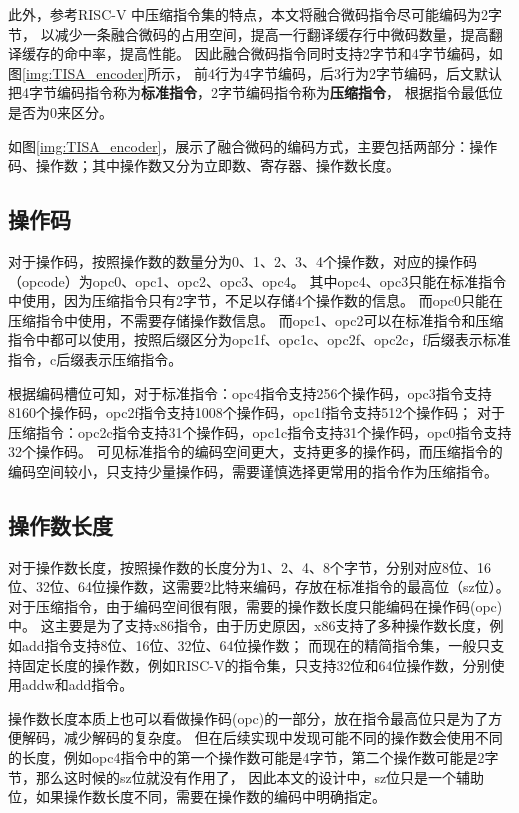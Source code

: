 此外，参考RISC-V 中压缩指令集的特点，本文将融合微码指令尽可能编码为2字节，
以减少一条融合微码的占用空间，提高一行翻译缓存行中微码数量，提高翻译缓存的命中率，提高性能。
因此融合微码指令同时支持2字节和4字节编码，如图\ref{img:TISA_encoder}所示，
前4行为4字节编码，后3行为2字节编码，后文默认把4字节编码指令称为\textbf{标准指令}，2字节编码指令称为\textbf{压缩指令}，
根据指令最低位是否为0来区分。

如图\ref{img:TISA_encoder}，展示了融合微码的编码方式，主要包括两部分：操作码、操作数；其中操作数又分为立即数、寄存器、操作数长度。



\subsection{操作码}
对于操作码，按照操作数的数量分为0、1、2、3、4个操作数，对应的操作码（opcode）为opc0、opc1、opc2、opc3、opc4。
其中opc4、opc3只能在标准指令中使用，因为压缩指令只有2字节，不足以存储4个操作数的信息。
而opc0只能在压缩指令中使用，不需要存储操作数信息。
而opc1、opc2可以在标准指令和压缩指令中都可以使用，按照后缀区分为opc1f、opc1c、opc2f、opc2c，f后缀表示标准指令，c后缀表示压缩指令。

根据编码槽位可知，对于标准指令：opc4指令支持256个操作码，opc3指令支持8160个操作码，opc2f指令支持1008个操作码，opc1f指令支持512个操作码；
对于压缩指令：opc2c指令支持31个操作码，opc1c指令支持31个操作码，opc0指令支持32个操作码。
可见标准指令的编码空间更大，支持更多的操作码，而压缩指令的编码空间较小，只支持少量操作码，需要谨慎选择更常用的指令作为压缩指令。

\subsection{操作数长度}
对于操作数长度，按照操作数的长度分为1、2、4、8个字节，分别对应8位、16位、32位、64位操作数，这需要2比特来编码，存放在标准指令的最高位（sz位）。
对于压缩指令，由于编码空间很有限，需要的操作数长度只能编码在操作码(opc)中。
这主要是为了支持x86指令，由于历史原因，x86支持了多种操作数长度，例如add指令支持8位、16位、32位、64位操作数；
而现在的精简指令集，一般只支持固定长度的操作数，例如RISC-V的指令集，只支持32位和64位操作数，分别使用addw和add指令。

操作数长度本质上也可以看做操作码(opc)的一部分，放在指令最高位只是为了方便解码，减少解码的复杂度。
但在后续实现中发现可能不同的操作数会使用不同的长度，例如opc4指令中的第一个操作数可能是4字节，第二个操作数可能是2字节，那么这时候的sz位就没有作用了，
因此本文的设计中，sz位只是一个辅助位，如果操作数长度不同，需要在操作数的编码中明确指定。

